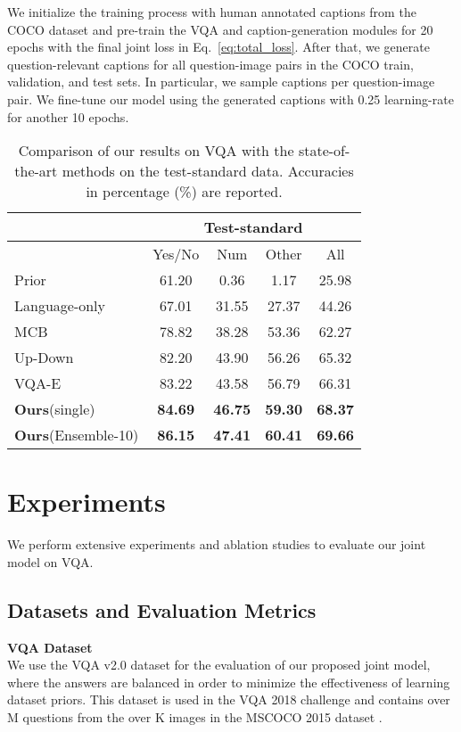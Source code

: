 \documentclass[11pt,a4paper]{article}
\begin{document}
 We initialize the training process with human annotated captions from the COCO dataset \cite{chen2015microsoft} and pre-train the VQA and  caption-generation modules for 20 epochs with the final joint loss in Eq.\ \ref{eq:total_loss}.  After that, we generate question-relevant captions for all question-image pairs in the COCO train, validation, and test sets. In particular, we sample  captions per question-image pair. We fine-tune our model using the generated captions with 0.25  learning-rate for another 10 epochs.


\begin{table*}[!t]
\centering
\begin{tabular}{l|ccc|c}
\hline \toprule
                   & \multicolumn{4}{c}{Test-standard} \\\hline
                       & Yes/No  & Num   & Other  &All\\ \hline\hline
Prior \cite{goyal2017making} &61.20 & 0.36 &1.17 & 25.98 \\
Language-only \cite{goyal2017making} & 67.01 &31.55 & 27.37 & 44.26\\
MCB \cite{fukui2016multimodal} & 78.82 & 38.28 & 53.36 & 62.27 \\
Up-Down \cite{anderson2017bottom}   & 82.20    & 43.90  & 56.26 & 65.32   \\
VQA-E \cite{li2018vqa}   & 83.22 & 43.58 & 56.79 & 66.31   \\
\textbf{Ours}(single) & \textbf{84.69}   &  \textbf{46.75}  &    \textbf{59.30}     & \textbf{68.37}    \\\hline
\textbf{Ours}(Ensemble-10)  &\textbf{86.15}   &  \textbf{47.41} &  \textbf{60.41}   & \textbf{69.66}    \\\bottomrule
\end{tabular}
\caption{Comparison of our results on VQA with the state-of-the-art methods on the test-standard data. Accuracies in percentage (\%) are reported.}
\label{tab:vqa_compare}
\end{table*}
\section{Experiments}
We perform extensive experiments and ablation studies to evaluate our joint model on VQA. 

\subsection{Datasets and Evaluation Metrics}
\noindent\textbf{VQA Dataset}\\
We use the VQA v2.0 dataset \cite{antol2015vqa} for the evaluation of our proposed joint model, where the answers are balanced in order to minimize the effectiveness of learning dataset priors. This dataset is used in the VQA 2018 challenge and contains over M questions from the over K images in the MSCOCO 2015 dataset \cite{chen2015microsoft}.
\end{document}
